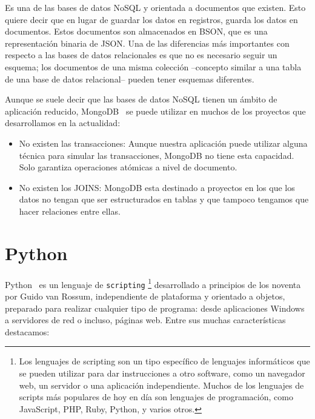 \documentclass[a4paper, 12pt]{book}
\begin{document}
Es una de las bases de datos NoSQL y orientada a documentos que existen. Esto quiere decir que en lugar de guardar los datos en registros, guarda los datos en documentos. Estos documentos son almacenados en BSON, que es una representación binaria de JSON. Una de las diferencias más importantes con respecto a las bases de datos relacionales es que no es necesario seguir un esquema; los documentos de una misma colección --concepto similar a una tabla de una base de datos relacional-- pueden tener esquemas diferentes.

	Aunque se suele decir que las bases de datos NoSQL tienen un ámbito de aplicación reducido, MongoDB~\cite{mongodb} se puede utilizar en muchos de los proyectos que desarrollamos en la actualidad:
\begin{itemize}
	\item No existen las transacciones: Aunque nuestra aplicación puede utilizar alguna técnica para simular las transacciones, MongoDB no tiene esta capacidad. Solo garantiza operaciones atómicas a nivel de documento.
	\item No existen los JOINS: MongoDB esta destinado a proyectos en los que los datos no tengan que  ser estructurados en tablas y que tampoco tengamos que hacer relaciones entre ellas.
\end{itemize}

\section{Python} 
\label{sec:Python}
Python~\cite{Python}  es un lenguaje de \texttt{scripting} 
\footnote{Los lenguajes de scripting son un tipo específico de lenguajes informáticos que se pueden utilizar para dar instrucciones a otro software, como un navegador web, un servidor o una aplicación independiente. Muchos de los lenguajes de scripts más populares de hoy en día son lenguajes de programación, como JavaScript, PHP, Ruby, Python, y varios otros.} desarrollado a principios de los noventa por Guido van Rossum, independiente de plataforma y orientado a objetos, preparado para realizar cualquier tipo de programa: desde aplicaciones Windows a servidores de red o incluso, páginas web. Entre sus muchas características destacamos:
\end{document}
